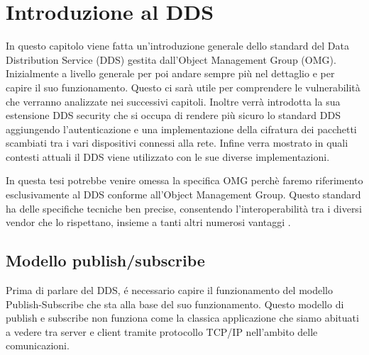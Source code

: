 \chapter{Introduzione al DDS}
In questo capitolo viene fatta un'introduzione generale dello 
standard del Data Distribution Service (DDS) gestita
dall'Object Management Group (OMG). Inizialmente a livello generale 
per poi andare sempre più nel
dettaglio e per capire il suo funzionamento. Questo ci sarà utile 
per comprendere le vulnerabilità che verranno analizzate nei
successivi capitoli. Inoltre verrà introdotta la sua estensione 
DDS security che si occupa di rendere più sicuro lo standard DDS 
aggiungendo l'autenticazione e una 
implementazione della cifratura dei pacchetti scambiati tra i vari
dispositivi connessi alla rete. 
Infine verra mostrato in quali contesti attuali il DDS viene
utilizzato con le sue diverse implementazioni.

In questa tesi potrebbe venire omessa la specifica OMG perchè 
faremo riferimento
esclusivamente al DDS conforme all'Object Management Group. Questo 
standard ha delle specifiche tecniche ben precise, consentendo
l'interoperabilità tra i diversi vendor che lo rispettano, insieme
a tanti altri numerosi vantaggi \cite{dds1.4}.


\section{Modello publish/subscribe}
Prima di parlare del DDS, é necessario capire il 
funzionamento del modello Publish-Subscribe 
che sta alla base del suo funzionamento.
Questo modello di publish e subscribe non funziona come la 
classica applicazione che siamo abituati a vedere tra server e
client tramite protocollo TCP/IP nell'ambito delle comunicazioni. 


